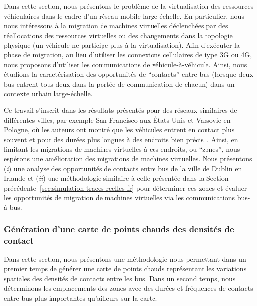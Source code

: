  
Dans cette section, nous présentons le problème de la virtualisation des ressources véhiculaires dans le cadre d’un réseau mobile large-échelle. En particulier, nous nous intéressons à la migration de machines virtuelles déclenchées par des réallocations des ressources virtuelles ou des changements dans la topologie physique (\eg un véhicule ne participe plus à la virtualisation). Afin d’exécuter la phase de migration, au lieu d’utiliser les connexions cellulaires de type 3G ou 4G, nous proposons d’utiliser les communications de véhicule-à-véhicule. Ainsi, nous étudions la caractérisation des opportunités de ``contacts'' entre bus (\ie lorsque deux bus entrent tous deux dans la portée de communication de chacun) dans un contexte urbain large-échelle. 
 
 
Ce travail s’inscrit dans les résultats présentés pour des réseaux similaires de différentes villes, par exemple San Francisco aux États-Unis et Varsovie en Pologne, où les auteurs ont montré que les véhicules entrent en contact plus souvent et pour des durées plus longues à des endroits bien précis~\cite{sarafijanovic2006island}. Ainsi, en limitant les migrations de machines virtuelles à ces endroits, ou ``zones'', nous espérons une amélioration des migrations de machines virtuelles. Nous présentons (\textit{i}) une analyse des opportunités de contacts entre bus de la ville de Dublin en Irlande et (\textit{ii}) une méthodologie similaire à celle présentée dans la Section précédente~\ref{sec:simulation-traces-reelles-fr} pour déterminer ces zones et évaluer les opportunités de migration de machines virtuelles via les communications bus-à-bus. 
 
 
\subsubsection{Génération d’une carte de points chauds des densités de contact} 
 
 
Dans cette section, nous présentons une méthodologie nous permettant dans un premier temps de générer une carte de points chauds représentant les variations spatiales des densités de contacts entre les bus. Dans un second temps, nous déterminons les emplacements des zones avec des durées et fréquences de contacts entre bus plus importantes qu’ailleurs sur la carte. 
 
